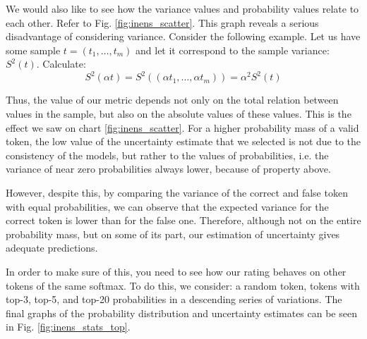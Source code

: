 \documentclass[a4paper,14pt]{extarticle}
\begin{document}
	We would also like to see how the variance values and probability values relate to each other. Refer to Fig. \ref{fig:inens_scatter}. This graph reveals a serious disadvantage of considering variance. Consider the following example. Let us have some sample $t = (t_1, \dots, t_m)$ and let it correspond to the sample variance: $S^2 (t)$. Calculate:
	\begin{equation*}
		S^2(\alpha t) = S^2((\alpha t_1, \dots, \alpha t_m)) = \alpha^2 S^2(t)
	\end{equation*}
	
	Thus, the value of our metric depends not only on the total relation between values in the sample, but also on the absolute values of these values. This is the effect we saw on chart \ref{fig:inens_scatter}. For a higher probability mass of a valid token, the low value of the uncertainty estimate that we selected is not due to the consistency of the models, but rather to the values of probabilities, i.e. the variance of near zero probabilities always lower, because of property above.

	However, despite this, by comparing the variance of the correct and false token with equal probabilities, we can observe that the expected variance for the correct token is lower than for the false one. Therefore, although not on the entire probability mass, but on some of its part, our estimation of uncertainty gives adequate predictions.
	
	\begin{figure}[t]
	\end{figure}

	In order to make sure of this, you need to see how our rating behaves on other tokens of the same softmax. To do this, we consider: a random token, tokens with top-3, top-5, and top-20 probabilities in a descending series of variations. The final graphs of the probability distribution and uncertainty estimates can be seen in Fig. \ref{fig:inens_stats_top}.
	
\end{document}
